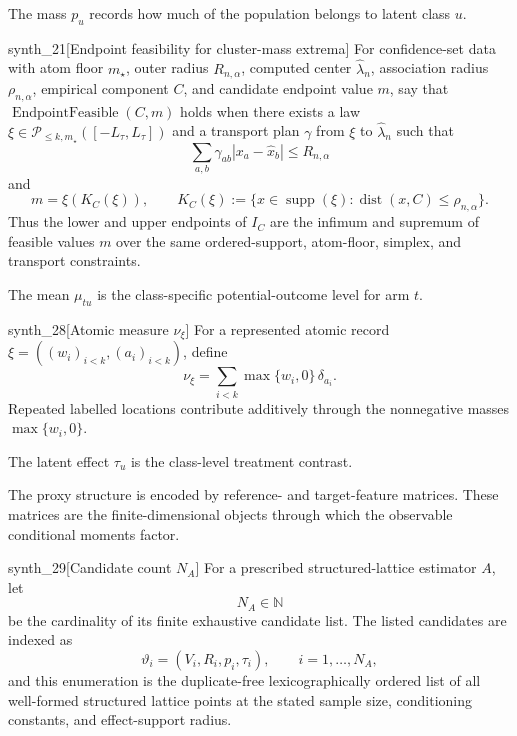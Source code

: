 \documentclass[11pt]{article}
\begin{document}
The mass \(p_u\) records how much of the population belongs to latent class \(u\).

\begin{definitionv}{synth_21}[Endpoint feasibility for cluster-mass extrema]
For confidence-set data with atom floor \(m_\star\), outer radius \(R_{n,\alpha}\), computed center \(\widehat\lambda_n\), association radius \(\rho_{n,\alpha}\), empirical component \(C\), and candidate endpoint value \(m\), say that \(\operatorname{EndpointFeasible}(C,m)\) holds when there exists a law \(\xi\in\mathcal P_{\le k,m_\star}([-L_\tau,L_\tau])\) and a transport plan \(\gamma\) from \(\xi\) to \(\widehat\lambda_n\) such that \[ \sum_{a,b}\gamma_{ab}|x_a-\widehat x_b|\le R_{n,\alpha} \] and \[ m=\xi(K_C(\xi)),\qquad K_C(\xi):=\{x\in\operatorname{supp}(\xi):\operatorname{dist}(x,C)\le\rho_{n,\alpha}\}. \] Thus the lower and upper endpoints of \(I_C\) are the infimum and supremum of feasible values \(m\) over the same ordered-support, atom-floor, simplex, and transport constraints.
\end{definitionv}

The mean \(\mu_{tu}\) is the class-specific potential-outcome level for arm \(t\).

\begin{definitionv}{synth_28}[Atomic measure \(\nu_\xi\)]
For a represented atomic record \(\xi=((w_i)_{i<k},(a_i)_{i<k})\), define
\[
\nu_\xi=\sum_{i<k}\max\{w_i,0\}\,\delta_{a_i}.
\]
Repeated labelled locations contribute additively through the nonnegative masses \(\max\{w_i,0\}\).
\end{definitionv}

The latent effect \(\tau_u\) is the class-level treatment contrast.

The proxy structure is encoded by reference- and target-feature matrices. These matrices are the finite-dimensional objects through which the observable conditional moments factor.

\begin{definitionv}{synth_29}[Candidate count \(N_A\)]
For a prescribed structured-lattice estimator \(A\), let
\[
N_A\in\mathbb N
\]
be the cardinality of its finite exhaustive candidate list. The listed candidates are indexed as
\[
\vartheta_i=(V_i,R_i,p_i,\tau_i),
\qquad i=1,\ldots,N_A,
\]
and this enumeration is the duplicate-free lexicographically ordered list of all well-formed structured lattice points at the stated sample size, conditioning constants, and effect-support radius.
\end{definitionv}
\end{document}
